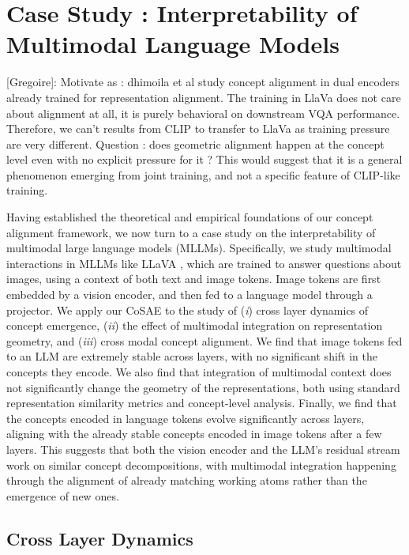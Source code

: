 \documentclass{article}
\newcommand{\greg}[1]{{\color{indigo}[Gregoire]: #1}}
\begin{document}
\section{Case Study : Interpretability of Multimodal Language Models}

\greg{Motivate as : dhimoila et al study concept alignment in dual encoders already trained for representation alignment. The training in LlaVa does not care about alignment at all, it is purely behavioral on downstream VQA performance. Therefore, we can't results from CLIP to transfer to LlaVa as training pressure are very different. Question : does geometric alignment happen at the concept level even with no explicit pressure for it ? This would suggest that it is a general phenomenon emerging from joint training, and not a specific feature of CLIP-like training.}

Having established the theoretical and empirical foundations of our concept alignment framework, we now turn to a case study on the interpretability of multimodal large language models (MLLMs). Specifically, we study multimodal interactions in MLLMs like LLaVA \citep{TODO:LaVA}, which are trained to answer questions about images, using a context of both text and image tokens. Image tokens are first embedded by a vision encoder, and then fed to a language model through a projector. We apply our CoSAE to the study of (\emph{i}) cross layer dynamics of concept emergence, (\emph{ii}) the effect of multimodal integration on representation geometry, and (\emph{iii}) cross modal concept alignment. We find that image tokens fed to an LLM are extremely stable across layers, with no significant shift in the concepts they encode. We also find that integration of multimodal context does not significantly change the geometry of the representations, both using standard representation similarity metrics and concept-level analysis. Finally, we find that the concepts encoded in language tokens evolve significantly across layers, aligning with the already stable concepts encoded in image tokens after a few layers. This suggests that both the vision encoder and the LLM's residual stream work on similar concept decompositions, with multimodal integration happening through the alignment of already matching working atoms rather than the emergence of new ones.

\subsection{Cross Layer Dynamics}
\label{sec:cross_layer_dynamics}
\end{document}
